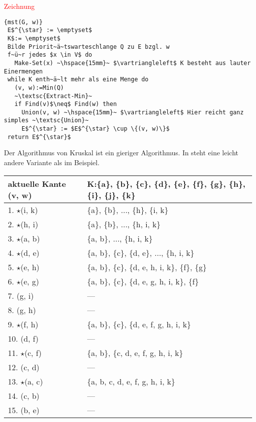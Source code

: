 \documentclass[ngerman,draft,parskip=half*,twoside]{scrreprt}
\theoremstyle{break}
\theoremstyle{nonumberbreak}
\begin{document}
\textcolor{red}{Zeichnung}

\begin{Algorithmus}[H]
\begin{lstlisting}[frame=tlrb, mathescape=true, title=\textsc{mst\textnormal{(G, w)}}, gobble=1]{mst(G, w)}
 E$^{\star} := \emptyset$
 K$:= \emptyset$
 Bilde Priorit~ä~tswarteschlange Q zu E bzgl. w
 f~ü~r jedes $x \in V$ do
   Make-Set(x) ~\hspace{15mm}~ $\vartriangleleft$ K besteht aus lauter Einermengen
 while K enth~ä~lt mehr als eine Menge do
   (v, w):=Min(Q)
   ~\textsc{Extract-Min}~
   if Find(v)$\neq$ Find(w) then
     Union(v, w) ~\hspace{15mm}~ $\vartriangleleft$ Hier reicht ganz simples ~\textsc{Union}~
     E$^{\star} := $E$^{\star} \cup \{(v, w)\}$
 return E$^{\star}$   
\end{lstlisting}
Der Algorithmus von Kruskal ist ein gieriger Algorithmus. In \cite{cormen} steht eine leicht andere Variante als im
Beispiel.
\end{Algorithmus}

\begin{tabular}{|l|l|}
aktuelle Kante (v, w) & K:\{a\}, \{b\}, \{c\}, \{d\}, \{e\}, \{f\}, \{g\}, \{h\}, \{i\}, \{j\}, \{k\}\\
\hline
1.  $\star$(i, k) & \{a\}, \{b\}, $\ldots$, \{h\}, \{i, k\}\\
2.  $\star$(h, i) & \{a\}, \{b\}, $\ldots$, \{h, i, k\}\\
3.  $\star$(a, b) & \{a, b\}, $\ldots$, \{h, i, k\}\\
\hline
4.  $\star$(d, e) & \{a, b\}, \{c\}, \{d, e\}, $\ldots$, \{h, i, k\}\\
5.  $\star$(e, h) & \{a, b\}, \{c\}, \{d, e, h, i, k\}, \{f\}, \{g\}\\
6.  $\star$(e, g) & \{a, b\}, \{c\}, \{d, e, g, h, i, k\}, \{f\}\\
\hline
7.  (g, i) & ---\\
8.  (g, h) & ---\\
9.  $\star$(f, h) & \{a, b\}, \{c\}, \{d, e, f, g, h, i, k\}\\
\hline
10.  (d, f) & ---\\
11.  $\star$(c, f) & \{a, b\}, \{c, d, e, f, g, h, i, k\}\\
12.  (c, d) & ---\\
\hline
13.  $\star$(a, c) & \{a, b, c, d, e, f, g, h, i, k\}\\
14.  (c, b) & ---\\
15.  (b, e) & ---\\
\end{tabular}
\end{document}
